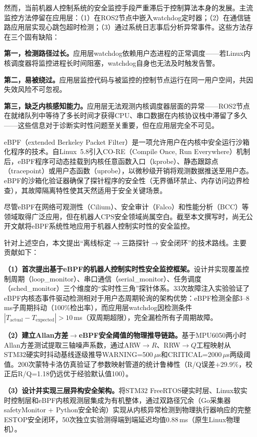 \documentclass{rjthesis}
\begin{document}
然而，当前机器人控制系统的安全监控手段严重滞后于控制算法本身的发展。主流监控方法停留在应用层：（1）在ROS2节点中嵌入watchdog定时器；（2）在通信链路应用层实现心跳包超时检测；（3）通过系统日志事后分析异常事件。这些方法存在三个固有缺陷：

\textbf{第一，检测路径过长。}应用层watchdog依赖用户态进程的正常调度——若Linux内核调度器将监控进程长时间阻塞，watchdog自身也无法及时触发告警。

\textbf{第二，易被绕过。}应用层监控代码与被监控的控制节点运行在同一用户空间，共因失效风险不可忽视。

\textbf{第三，缺乏内核感知能力。}应用层无法观测内核调度器层面的异常——ROS2节点在就绪队列中等待了多长时间才获得CPU、串口数据在内核协议栈中滞留了多久——这些信息对于诊断实时性问题至关重要，但在应用层完全不可见。

eBPF（extended Berkeley Packet Filter）\cite{sharaf2022,gregg2019}是一项允许用户在内核中安全运行沙箱化程序的技术。自Linux~5.8引入CO-RE（Compile Once, Run Everywhere）机制后，eBPF程序可动态挂载到内核任意函数入口（kprobe）、静态跟踪点（tracepoint）或用户态函数（uprobe），以微秒级开销将观测数据推送至用户态。eBPF的沙箱化验证器确保了探针程序的安全性（无界循环禁止、内存访问边界检查），其故障隔离特性使其天然适用于安全关键场景。

尽管eBPF在网络可观测性（Cilium）、安全审计（Falco）和性能分析（BCC）等领域取得广泛应用\cite{cilium_ebpf,sharaf2022}，但在机器人CPS安全领域尚属空白。截至本文撰写时，尚无公开文献将eBPF系统性地应用于机器人控制实时性的安全监控。

针对上述空白，本文提出``离线标定$\to$三路探针$\to$安全闭环''的技术路线。主要贡献如下：

\textbf{（1）首次提出基于eBPF的机器人控制实时性安全监控框架。}设计并实现覆盖控制周期（loop\_monitor）、串口通信（serial\_monitor）、任务调度（sched\_monitor）三个维度的``实时性三角''探针体系。33次故障注入实验验证了eBPF内核态事件驱动检测相对于用户态周期轮询的架构优势：eBPF检测全部3--8\,ms子周期抖动（100\%检出率），而应用层watchdog因检测条件$|T_{\text{actual}}-T_{\text{expected}}|>10$\,ms（双周期超限），完全漏检所有子周期故障。

\textbf{（2）建立Allan方差$\to$eBPF安全阈值的物理推导链路。}基于MPU6050两小时Allan方差测试提取三轴噪声系数，通过ARW$\to R$、RRW$\to Q$工程映射从STM32硬实时抖动基线逐级推导WARNING=500\,$\mu$s和CRITICAL=2000\,$\mu$s两级阈值。200次蒙特卡洛仿真验证了参数映射管道的统计鲁棒性（R/Q误差$+29.9\%$，校正后R/Q=1.18仍远优于经验默认值100）。

\textbf{（3）设计并实现三层异构安全架构。}将STM32 FreeRTOS硬实时层、Linux软实时控制层和eBPF内核观测层集成为有机整体，通过双路径冗余（Go采集器safetyMonitor + Python安全轮询）实现从内核异常检测到物理执行器响应的完整ESTOP安全闭环，50次独立实验测得端到端延迟均值0.88\,ms（原生Linux物理机）。
\end{document}
